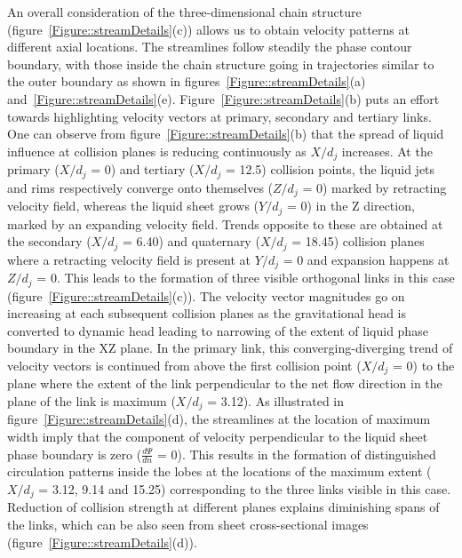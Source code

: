 \documentclass[%
 aip,
 sd,%
amsmath,amssymb,
preprint,%
author-year,%
]{revtex4-1}
\begin{document}
An overall consideration of the three-dimensional chain structure (figure~\ref{Figure::streamDetails}(c)) allows us to obtain velocity patterns at different axial locations. The streamlines follow steadily the phase contour boundary, with those inside the chain structure going in trajectories similar to the outer boundary as shown in figures~\ref{Figure::streamDetails}(a) and~\ref{Figure::streamDetails}(e). Figure~\ref{Figure::streamDetails}(b) puts an effort towards highlighting velocity vectors at primary, secondary and tertiary links. One can observe from figure~\ref{Figure::streamDetails}(b) that the spread of liquid influence at collision planes is reducing continuously as $X/d_j$ increases.  At the primary ($X/d_j$ = 0) and tertiary ($X/d_j$ = 12.5) collision points, the liquid jets and rims respectively converge onto themselves ($Z/d_j$ = 0) marked by retracting velocity field, whereas the liquid sheet grows ($Y/d_j$ = 0) in the Z direction, marked by an expanding velocity field. Trends opposite to these are obtained at the secondary ($X/d_j$ = 6.40) and quaternary ($X/d_j$ = 18.45) collision planes where a retracting velocity field is present at $Y/d_j$ = 0 and expansion happens at $Z/d_j$ = 0. This leads to the formation of three visible orthogonal links in this case (figure~\ref{Figure::streamDetails}(c)). The velocity vector magnitudes go on increasing at each subsequent collision planes as the gravitational head is converted to dynamic head leading to narrowing of the extent of liquid phase boundary in the XZ plane. In the primary link, this converging-diverging trend of velocity vectors is continued from above the first collision point ($X/d_j$ = 0) to the plane where the extent of the link perpendicular to the net flow direction in the plane of the link is maximum ($X/d_j$ = 3.12). As illustrated in figure~\ref{Figure::streamDetails}(d), the streamlines at the location of maximum width imply that the component of velocity perpendicular to the liquid sheet phase boundary is zero ($\frac{d\Psi}{dn}$ = 0). This results in the formation of distinguished circulation patterns inside the lobes at the locations of the maximum extent ($X/d_j$ = 3.12, 9.14 and 15.25) corresponding to the three links visible in this case. Reduction of collision strength at different planes explains diminishing spans of the links, which can be also seen from sheet cross-sectional images (figure~\ref{Figure::streamDetails}(d)).\\
\end{document}
